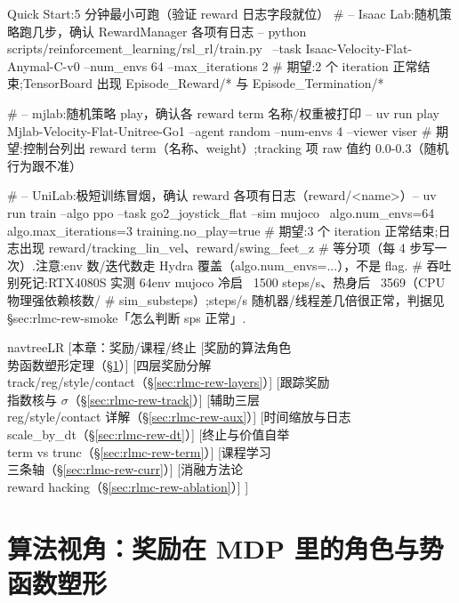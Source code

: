 \begin{codebox}[bash]{Quick Start:5 分钟最小可跑（验证 reward 日志字段就位）}
# -- Isaac Lab:随机策略跑几步，确认 RewardManager 各项有日志 --
python scripts/reinforcement_learning/rsl_rl/train.py \
  --task Isaac-Velocity-Flat-Anymal-C-v0 --num_envs 64 --max_iterations 2
# 期望:2 个 iteration 正常结束;TensorBoard 出现 Episode_Reward/* 与 Episode_Termination/*

# -- mjlab:随机策略 play，确认各 reward term 名称/权重被打印 --
uv run play Mjlab-Velocity-Flat-Unitree-Go1 --agent random --num-envs 4 --viewer viser
# 期望:控制台列出 reward term（名称、weight）;tracking 项 raw 值约 0.0-0.3（随机行为跟不准）

# -- UniLab:极短训练冒烟，确认 reward 各项有日志（reward/<name>）--
uv run train --algo ppo --task go2_joystick_flat --sim mujoco \
  algo.num_envs=64 algo.max_iterations=3 training.no_play=true
# 期望:3 个 iteration 正常结束;日志出现 reward/tracking_lin_vel、reward/swing_feet_z
#   等分项（每 4 步写一次）.注意:env 数/迭代数走 Hydra 覆盖（algo.num_envs=...），不是 flag.
# 吞吐别死记:RTX4080S 实测 64env mujoco 冷启 ~1500 steps/s、热身后 ~3569（CPU 物理强依赖核数/
#   sim_substeps）;steps/s 随机器/线程差几倍很正常，判据见 §sec:rlmc-rew-smoke「怎么判断 sps 正常」.
\end{codebox}

\begin{center}
\begin{forest} navtreeLR
[{本章：奖励/课程/终止}
  [{奖励的算法角色\\势函数塑形定理（\S\ref{sec:rlmc-rew-theory}）}]
  [{四层奖励分解\\track/reg/style/contact（\S\ref{sec:rlmc-rew-layers}）}]
  [{跟踪奖励\\指数核与 $\sigma$（\S\ref{sec:rlmc-rew-track}）}]
  [{辅助三层\\reg/style/contact 详解（\S\ref{sec:rlmc-rew-aux}）}]
  [{时间缩放与日志\\scale\_by\_dt（\S\ref{sec:rlmc-rew-dt}）}]
  [{终止与价值自举\\term vs trunc（\S\ref{sec:rlmc-rew-term}）}]
  [{课程学习\\三条轴（\S\ref{sec:rlmc-rew-curr}）}]
  [{消融方法论\\reward hacking（\S\ref{sec:rlmc-rew-ablation}）}]
]
\end{forest}
\end{center}

\section{算法视角：奖励在 MDP 里的角色与势函数塑形}
\label{sec:rlmc-rew-theory}

